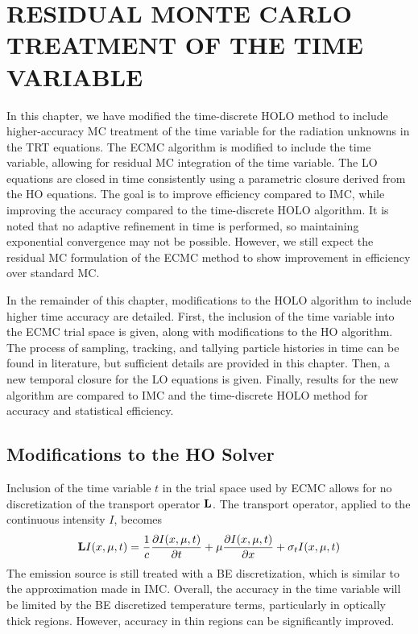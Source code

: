 
\chapter{ \uppercase {Residual Monte Carlo Treatment of the Time Variable}}
\label{sec:time}

In this chapter, we have modified the time-discrete HOLO method to include higher-accuracy MC treatment
of the time variable for the radiation unknowns in the TRT equations.  The ECMC algorithm
is modified to include the time variable, allowing for residual MC integration of the time
variable. The LO equations are closed in time consistently using a parametric closure
derived from the HO equations. The goal is to improve
efficiency compared to IMC, while improving the accuracy compared to the time-discrete
HOLO algorithm. 
It is
noted that no adaptive refinement in time is performed, so maintaining exponential convergence
may not be possible.  However, we still expect the residual MC formulation of the ECMC method
to show improvement in efficiency over standard MC.

In the remainder of this chapter, modifications to the HOLO algorithm to include higher
time accuracy are detailed.
First, the inclusion of the time variable into the ECMC trial
space is given, along with modifications to the HO algorithm.
The process of sampling, tracking, and tallying particle histories in time
can be found in literature\cite{wollaber_review,fnc,wollaber_thesis,cj_thesis}, but
sufficient details are provided in this chapter.  Then, a new temporal closure for the LO
equations is given.  Finally, results for the new algorithm are compared to
IMC and the time-discrete HOLO method for accuracy and statistical efficiency.  

\section{Modifications to the HO Solver}
\label{sec:time_ho}

Inclusion of the time variable $t$ in the trial space used by ECMC allows for no discretization of the
transport operator $\mathbf{L}$.  The transport operator, applied to the continuous intensity
$I$, becomes
\begin{equation}
    \mathbf{L}I(x,\mu,t) = \frac{1}{c}\frac{\partial I(x,\mu,t)}{\partial t}  + \mu \frac{\partial I(x,\mu,t)}{\partial x} + \sigma_t I(x,\mu,t)
\end{equation}
The emission source is still treated with a BE discretization, which is
similar to the approximation made in IMC.  Overall, the accuracy in the time variable will be limited by the BE discretized temperature
terms, particularly in optically thick
regions.  However, accuracy in thin regions can be significantly improved.

